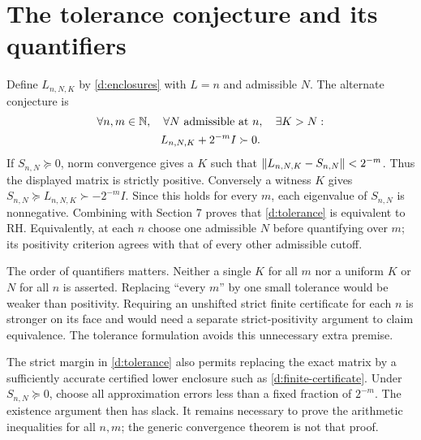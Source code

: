 \section{The tolerance conjecture and its quantifiers}
Define $L_{n,N,K}$ by \eqref{d:enclosures} with $L=n$ and admissible $N$.
The alternate conjecture is
\begin{equation}\label{d:tolerance}
\begin{gathered}
\forall n,m\in\mathbb N,\quad\forall N\text{ admissible at }n,\quad\exists K>N:\\
L_{n,N,K}+2^{-m}I\succ0.
\end{gathered}
\end{equation}
If $S_{n,N}\succeq0$, norm convergence gives a $K$ such that
$\left\lVert L_{n,N,K}-S_{n,N}\right\rVert<2^{-m}$. Thus the displayed matrix is strictly
positive. Conversely a witness $K$ gives
$S_{n,N}\succeq L_{n,N,K}\succ-2^{-m}I$. Since this holds for every $m$,
each eigenvalue of $S_{n,N}$ is nonnegative. Combining with Section 7 proves
that \eqref{d:tolerance} is equivalent to RH.
Equivalently, at each $n$ choose one admissible $N$ before quantifying over
$m$; its positivity criterion agrees with that of every other admissible cutoff.

The order of quantifiers matters. Neither a single $K$ for all $m$ nor a
uniform $K$ or $N$ for all $n$ is asserted. Replacing ``every $m$'' by one
small tolerance would be weaker than positivity. Requiring an unshifted
strict finite certificate for each $n$ is stronger on its face and would
need a separate strict-positivity argument to claim equivalence.
The tolerance formulation avoids this unnecessary extra premise.

The strict margin in \eqref{d:tolerance} also permits replacing the exact
matrix by a sufficiently accurate certified lower enclosure such as
\eqref{d:finite-certificate}. Under $S_{n,N}\succeq0$, choose all approximation
errors less than a fixed fraction of $2^{-m}$. The existence argument
then has slack. It remains necessary to prove the arithmetic inequalities
for all $n,m$; the generic convergence theorem is not that proof.

